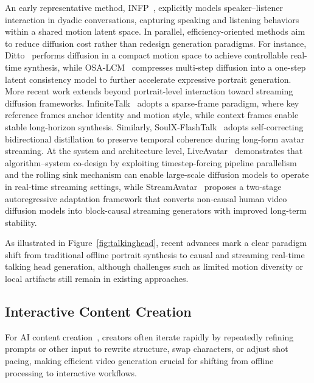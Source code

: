 \documentclass[lettersize,journal]{IEEEtran}
\begin{document}
An early representative method, INFP~\cite{zhu2024infp}, explicitly models speaker–listener interaction in dyadic conversations, capturing speaking and listening behaviors within a shared motion latent space. In parallel, efficiency-oriented methods aim to reduce diffusion cost rather than redesign generation paradigms. For instance, Ditto~\cite{li2025ditto} performs diffusion in a compact motion space to achieve controllable real-time synthesis, while OSA-LCM~\cite{guo2024real} compresses multi-step diffusion into a one-step latent consistency model to further accelerate expressive portrait generation. More recent work extends beyond portrait-level interaction toward streaming diffusion frameworks. InfiniteTalk~\cite{yang2025infinitetalkaudiodrivenvideogeneration} adopts a sparse-frame paradigm, where key reference frames anchor identity and motion style, while context frames enable stable long-horizon synthesis. Similarly, SoulX-FlashTalk~\cite{shen2025soulx} adopts self-correcting bidirectional distillation to preserve temporal coherence during long-form avatar streaming. At the system and architecture level, LiveAvatar~\cite{huang2025live} demonstrates that algorithm–system co-design by exploiting timestep-forcing pipeline parallelism and the rolling sink mechanism can enable large-scale diffusion models to operate in real-time streaming settings, while StreamAvatar~\cite{sun2025streamavatarstreamingdiffusionmodels} proposes a two-stage autoregressive adaptation framework that converts non-causal human video diffusion models into block-causal streaming generators with improved long-term stability.

As illustrated in Figure~\ref{fig:talkinghead}, recent advances mark a clear paradigm shift from traditional offline portrait synthesis to causal and streaming real-time talking head generation, although challenges such as limited motion diversity or local artifacts still remain in existing approaches.

\subsection{Interactive Content Creation}
For AI content creation~\cite{guoedit}, creators often iterate rapidly by repeatedly refining prompts or other input to rewrite structure, swap characters, or adjust shot pacing, making efficient video generation crucial for shifting from offline processing to interactive workflows. 
\end{document}
